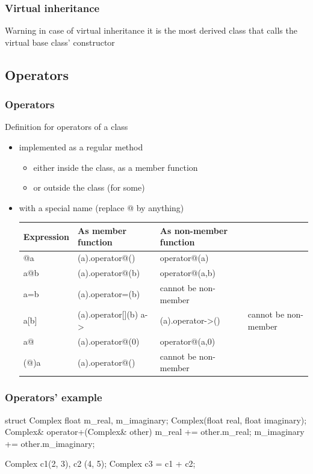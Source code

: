 \begin{frame}[fragile]
  \frametitle{Virtual inheritance}
  \begin{alertblock}{Warning}
    in case of virtual inheritance it is the most derived class that calls the virtual base class' constructor
  \end{alertblock}
\end{frame}


\subsection{Operators}

\begin{frame}
  \frametitle{Operators}
  \begin{block}{Definition for operators of a class}
    \begin{itemize}
    \item implemented as a regular method
      \begin{itemize}
      \item either inside the class, as a member function
      \item or outside the class (for some)
      \end{itemize}
    \item with a special name (replace @ by anything)
      \begin{tabular}{llll}
        Expression & As member function & As non-member function \\
        \hline
        @a & (a).operator@() & operator@(a) \\
        a@b & (a).operator@(b) & operator@(a,b) \\
        a=b & (a).operator=(b) & cannot be non-member \\
        a[b] & (a).operator[](b)
        a-\textgreater & (a).operator-\textgreater() & cannot be non-member \\
        a@ & (a).operator@(0) & operator@(a,0) \\
        (@)a & (a).operator@() & cannot be non-member \\
      \end{tabular}
    \end{itemize}
  \end{block}
\end{frame}

\begin{frame}[fragile]
  \frametitle{Operators' example}
  \begin{cppcode*}{}
    struct Complex {
      float m_real, m_imaginary;
      Complex(float real, float imaginary);
      Complex& operator+(Complex& other) {
        m_real += other.m_real;
        m_imaginary += other.m_imaginary;
      }
    }

    Complex c1(2, 3), c2 (4, 5);
    Complex c3 = c1 + c2;
  \end{cppcode*}
\end{frame}

